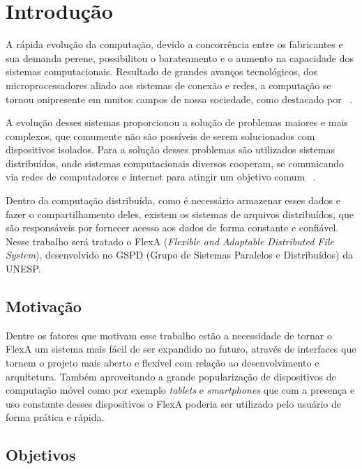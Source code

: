 
\chapter{Introdução}
\label{cap1}

    A rápida evolução da computação, devido a concorrência entre os fabricantes e sua demanda perene, possibilitou o barateamento e o aumento na capacidade dos sistemas computacionais. Resultado de grandes avanços tecnológicos, dos microprocessadores aliado aos sistemas de conexão e redes, a computação se tornou onipresente em muitos campos de nossa sociedade, como destacado por ~\cite{tanenbaum}.

    A evolução desses sistemas proporcionou a solução de problemas maiores e mais complexos, que comumente não são possíveis de serem solucionados com dispositivos isolados. Para a solução desses problemas são utilizados sistemas distribuídos, onde sistemas computacionais diversos cooperam, se comunicando via redes de computadores e internet para atingir um objetivo comum ~\cite{coulouris}.

    Dentro da computação distribuída, como é necessário armazenar esses dados e fazer o compartilhamento deles, existem os sistemas de arquivos distribuídos, que são responsáveis por fornecer acesso aos dados de forma constante e confiável. Nesse trabalho será tratado o FlexA (\textit{Flexible and Adaptable Distributed File System}), desenvolvido no GSPD (Grupo de Sistemas Paralelos e Distribuídos) da UNESP.


\section{Motivação}

    Dentre os fatores que motivam esse trabalho estão a necessidade de tornar o FlexA um sistema mais fácil de ser expandido no futuro, através de  interfaces que tornem o projeto mais aberto e flexível com relação ao desenvolvimento e arquitetura. Também aproveitando a grande popularização de dispositivos de computação móvel como por exemplo \textit{tablets} e \textit{smartphones} que com a presença e uso constante desses dispositivos o FlexA poderia ser utilizado pelo usuário de forma prática e rápida.

\section{Objetivos}

